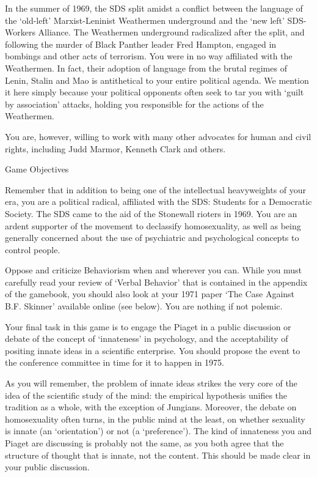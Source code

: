 \begin{refsection}
In the summer of 1969, the SDS split amidst a conflict between the language of the ‘old-left’ Marxist-Leninist Weathermen underground and the ‘new left’ SDS-Workers Alliance. The Weathermen underground radicalized after the split, and following the murder of Black Panther leader Fred Hampton, engaged in bombings and other acts of terrorism. You were in no way affiliated with the Weathermen. In fact, their adoption of language from the brutal regimes of Lenin, Stalin and Mao is antithetical to your entire political agenda. We mention it here simply because your political opponents often seek to tar you with ‘guilt by association’ attacks, holding you responsible for the actions of the Weathermen.

You are, however, willing to work with many other advocates for human and civil rights, including Judd Marmor, Kenneth Clark and others.

Game Objectives

Remember that in addition to being one of the intellectual heavyweights of your era, you are a political radical, affiliated with the SDS: Students for a Democratic Society. The SDS came to the aid of the Stonewall rioters in 1969. You are an ardent supporter of the movement to declassify homosexuality, as well as being generally concerned about the use of psychiatric and psychological concepts to control people.

Oppose and criticize Behaviorism when and wherever you can. While you must carefully read your review of `Verbal Behavior' that is contained in the appendix of the gamebook, you should also look at your 1971 paper `The Case Against B.F. Skinner' available online (see below). You are nothing if not polemic.

Your final task in this game is to engage the Piaget in a public discussion or debate of the concept of `innateness' in psychology, and the acceptability of positing innate ideas in a scientific enterprise. You should propose the event to the conference committee in time for it to happen in 1975.

As you will remember, the problem of innate ideas strikes the very core of the idea of the scientific study of the mind: the empirical hypothesis unifies the tradition as a whole, with the exception of Jungians. Moreover, the debate on homosexuality often turns, in the public mind at the least, on whether sexuality is innate (an `orientation') or not (a `preference'). The kind of innateness you and Piaget are discussing is probably not the same, as you both agree that the structure of thought that is innate, not the content. This should be made clear in your public discussion.


\end{refsection}
